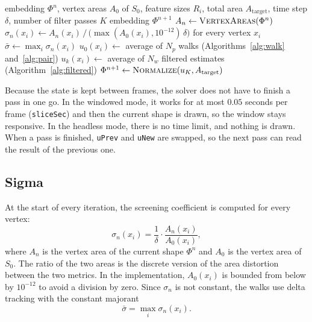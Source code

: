 \documentclass[
]{elteiktdk}[2024/04/26]
\begin{document}
	\begin{algorithm}[H]
		\small
		\caption[One iteration]{One iteration of the solver: computing $\Phi^{n+1}$ from $\Phi^n$.}
		\label{alg:iteration}
		\begin{algorithmic}[1]
			\Require embedding $\Phi^n$, vertex areas $A_0$ of $S_0$, feature sizes $R_i$, total area $A_{\mathrm{target}}$, time step $\delta$, number of filter passes $K$
			\Ensure embedding $\Phi^{n+1}$
			\State $A_n \gets \textsc{VertexAreas}(\Phi^n)$
			\State $\sigma_n(x_i) \gets A_n(x_i) \,/\, \bigl(\max(A_0(x_i), 10^{-12})\,\delta\bigr)$ for every vertex $x_i$
			\State $\bar\sigma \gets \max_i \sigma_n(x_i)$
			 
			\State $u_0(x_i) \gets$ average of $N_p$ walks (Algorithms~\ref{alg:walk} and~\ref{alg:pair})
			\EndFor
			 
			\State $u_k(x_i) \gets$ average of $N_w$ filtered estimates (Algorithm~\ref{alg:filtered})
			\EndFor
			\EndFor
			\State $\Phi^{n+1} \gets \textsc{Normalize}(u_K, A_{\mathrm{target}})$ 
		\end{algorithmic}
	\end{algorithm}
	Because the state is kept between frames, the solver does not have to finish a pass in one go. In the windowed mode, it works for at most $0.05$ seconds per frame (\texttt{sliceSec}) and then the current shape is drawn, so the window stays responsive. In the headless mode, there is no time limit, and nothing is drawn. When a pass is finished, \texttt{uPrev} and \texttt{uNew} are swapped, so the next pass can read the result of the previous one.
	
	\subsection{Sigma}
	
	At the start of every iteration, the screening coefficient is computed for every vertex:
	\[
	\sigma_n(x_i) = \frac{1}{\delta} \cdot \frac{A_n(x_i)}{A_0(x_i)},
	\]
	where $A_n$ is the vertex area of the current shape $\Phi^n$ and $A_0$ is the vertex area of $S_0$. The ratio of the two areas is the discrete version of the area distortion between the two metrics.
	In the implementation, $A_0(x_i)$ is bounded from below by $10^{-12}$ to avoid a division by zero.
	Since $\sigma_n$ is not constant, the walks use delta tracking \cite{sawhneyseyb22gridfree} with the constant majorant
	\[
	\bar{\sigma} = \max_i \sigma_n(x_i).
	\]
	
\end{document}
